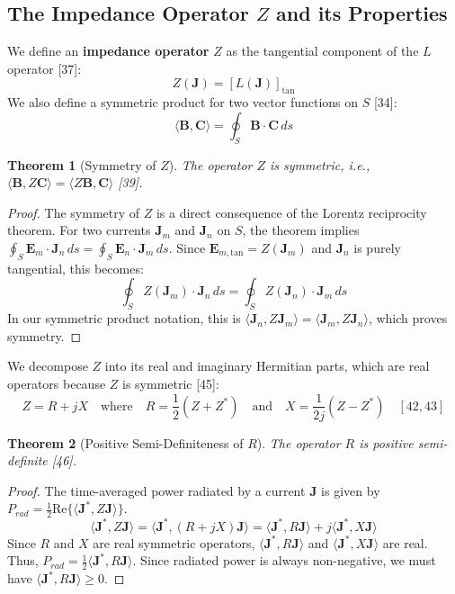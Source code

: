 \documentclass[11pt]{article}
\newcommand{\vect}[1]{\mathbf{#1}}
\newcommand{\sprod}[2]{\langle #1, #2 \rangle}
\newtheorem{theorem}{Theorem}[section]
\theoremstyle{definition}
\begin{document}
\subsection{The Impedance Operator $Z$ and its Properties}
We define an \textbf{impedance operator} $Z$ as the tangential component of the $L$ operator [37]:
\begin{equation}
Z(\vect{J}) = [L(\vect{J})]_{\text{tan}}
\end{equation}
We also define a symmetric product for two vector functions on $S$ [34]:
\begin{equation}
\sprod{\vect{B}}{\vect{C}} = \oint_S \vect{B} \cdot \vect{C} \, ds
\end{equation}

\begin{theorem}[Symmetry of $Z$]
The operator $Z$ is symmetric, i.e., $\sprod{\vect{B}}{Z\vect{C}} = \sprod{Z\vect{B}}{\vect{C}}$ [39].
\end{theorem}
\begin{proof}
The symmetry of $Z$ is a direct consequence of the Lorentz reciprocity theorem. For two currents $\vect{J}_m$ and $\vect{J}_n$ on $S$, the theorem implies $\oint_S \vect{E}_m \cdot \vect{J}_n \, ds = \oint_S \vect{E}_n \cdot \vect{J}_m \, ds$. Since $\vect{E}_{m, \text{tan}} = Z(\vect{J}_m)$ and $\vect{J}_n$ is purely tangential, this becomes:
\[ \oint_S Z(\vect{J}_m) \cdot \vect{J}_n \, ds = \oint_S Z(\vect{J}_n) \cdot \vect{J}_m \, ds \]
In our symmetric product notation, this is $\sprod{\vect{J}_n}{Z\vect{J}_m} = \sprod{\vect{J}_m}{Z\vect{J}_n}$, which proves symmetry.
\end{proof}

We decompose $Z$ into its real and imaginary Hermitian parts, which are real operators because $Z$ is symmetric [45]:
\begin{equation}
Z = R + jX \quad \text{where} \quad R = \frac{1}{2}(Z + Z^*) \quad \text{and} \quad X = \frac{1}{2j}(Z - Z^*) \quad [42, 43]
\end{equation}

\begin{theorem}[Positive Semi-Definiteness of $R$]
The operator $R$ is positive semi-definite [46].
\end{theorem}
\begin{proof}
The time-averaged power radiated by a current $\vect{J}$ is given by $P_{rad} = \frac{1}{2} \text{Re} \{ \sprod{\vect{J}^*}{Z\vect{J}} \}$.
\[ \sprod{\vect{J}^*}{Z\vect{J}} = \sprod{\vect{J}^*}{(R+jX)\vect{J}} = \sprod{\vect{J}^*}{R\vect{J}} + j\sprod{\vect{J}^*}{X\vect{J}} \]
Since $R$ and $X$ are real symmetric operators, $\sprod{\vect{J}^*}{R\vect{J}}$ and $\sprod{\vect{J}^*}{X\vect{J}}$ are real. Thus, $P_{rad} = \frac{1}{2} \sprod{\vect{J}^*}{R\vect{J}}$. Since radiated power is always non-negative, we must have $\sprod{\vect{J}^*}{R\vect{J}} \ge 0$.
\end{proof}
\end{document}
